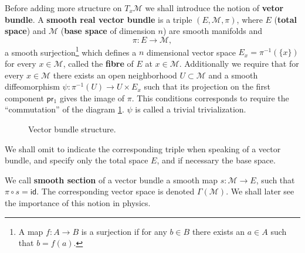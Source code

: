 \documentclass[11pt]{book}
\newcommand{\id}{\mathsf{id}}
\newcommand{\Mcal}{\mathcal{M}}
\newcommand{\psf}{\mathsf{p}}
\newcommand{\rsf}{\mathsf{r}}
\theoremstyle{break}
\begin{document}
Before adding more structure on $T_x \Mcal$ we shall introduce the notion of \textbf{vetor bundle}. A \textbf{smooth real vector bundle} is a triple $(E,\Mcal,\pi)$, where $E$ (\textbf{total space}) and $\Mcal$ (\textbf{base space} of dimension $n$) are smooth manifolds and 
%
\begin{equation*}
\pi : E \to \Mcal , 
\end{equation*}
%
a smooth surjection\footnote{A map $f : A \to B$ is a surjection if for any $b \in B$ there exists an $a\in A$ such that $b=f(a)$.} which defines a $n$ dimensional vector space $E_x = \pi^{-1}(\{x\})$ for every $x \in \Mcal$, called the \textbf{fibre} of $E$ at $x\in\Mcal$. Additionally we require that for every $x\in\Mcal$ there exists an open neighborhood $U \subset \Mcal$ and a smooth diffeomorphism $\psi : \pi^{-1}(U) \to U \times E_x$ such that its projection on the first component $\psf\rsf_1$ gives the image of $\pi$. This conditions corresponds to require the ``commutation'' of the diagram \ref{fig:vect_bund_strut}. $\psi$ is called a trivial trivialization.


\begin{figure}[ht!]
\begin{center}
\end{center}
\caption{Vector bundle structure.}
\label{fig:vect_bund_strut}
\end{figure}


We shall omit to indicate the corresponding triple when speaking of a vector bundle, and specify only the total space $E$, and if necessary the base space.




We call \textbf{smooth section} of a vector bundle a smooth map $s : \Mcal \to E$, such that $\pi \circ s = \id$. The corresponding vector space is denoted $\Gamma(\Mcal)$. We shall later see the importance of this notion in physics.
\end{document}
